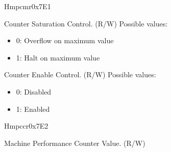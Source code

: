 \begin{register}{H}{mpcmr}{0x7E1}\label{regdesc:MPCMR}
%
%
%
\regnewline%
\begin{regdesc}\begin{reglist}
\label{fielddesc:COUNTER_SATURATION}\item [COUNT\_SAT] Counter Saturation Control. (R/W)
\newline Possible values:
\begin{itemize}
    \setlength\itemsep{-1em}
    \item 0: Overflow on maximum value
    \item 1: Halt on maximum value
\end{itemize}
\label{fielddesc:COUNTER_ENABLE}\item [COUNT\_EN] Counter Enable Control. (R/W)
\newline Possible values:
\begin{itemize}
    \setlength\itemsep{-1em}
    \item 0: Disabled
    \item 1: Enabled
\end{itemize}
\end{reglist}\end{regdesc}
\end{register}

\begin{register}{H}{mpccr}{0x7E2}\label{regdesc:MPCCR}
%
\regnewline%
\begin{regdesc}\begin{reglist}
\label{fielddesc:MPCCR}\item [MPCCR] Machine Performance Counter Value. (R/W)
\end{reglist}\end{regdesc}
\end{register}

